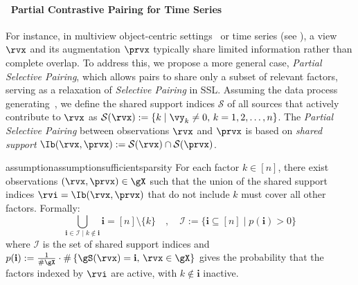 \documentclass{article} %
\theoremstyle{plain}
\theoremstyle{definition}
\newtheorem{assumption}[theorem]{Assumption}
\theoremstyle{remark}
\numberwithin{equation}{section}
\begin{document}
\vspace{-0.2cm}
\paragraph{\, Partial Contrastive Pairing for Time Series}
For instance, in multiview object-centric settings~\citep{Bengio2020A} or time series (see ), a view $\rvx$ and its augmentation $\prvx$ typically share limited information rather than complete overlap. To address this, we propose a more general case, \emph{Partial Selective Pairing}, which allows pairs to share only a subset of relevant factors, serving as a relaxation of \emph{Selective Pairing} in SSL. Assuming the data process generating~, we define the shared support indices $\mathcal{S} $ of all sources that actively contribute to $\rvx$ as $\mathcal{S}(\rvx) := \{ k \mid \vy_{k} \neq 0, \, k = 1, 2, \ldots, n \} $. The \emph{Partial Selective Pairing} between observations $\rvx $ and $\prvx $ is based on \emph{shared support}  $\Ib(\rvx, \prvx) :=\mathcal{S}(\rvx) \cap \mathcal{S}(\prvx)$.

\begin{restatable}{assumption}{assumptionsufficientsparsity}\label{assump:sufficient_partial_pairing}
For each factor $ k \in [n] $, there exist observations $(\rvx, \prvx) \in \gX$ such that the union of the shared support indices $\rvi = \Ib(\rvx, \prvx)$ that do not include $ k $ must cover all other factors. Formally:
\begin{equation}\label{eq-sufficient_partial_pairing}
\bigcup_{\mathbf{i} \in \mathcal{I} \mid k \notin \mathbf{i}} \mathbf{i} = [n] \setminus \{k\} \quad, \quad \mathcal{I} := \{ \mathbf{i} \subseteq [n] \mid p(\mathbf{i}) > 0 \}
\end{equation}
where \( \mathcal{I} \) is the set of shared support indices and \( p(\mathbf{i}) := \frac{1}{\# \gX} \cdot \# \left\{ \gS(\rvx) = \mathbf{i}, \, \rvx \in \gX \right\} \) gives the probability that the factors indexed by \( \rvi \) are active, with \( k \notin \mathbf{i} \) inactive.
\end{restatable}



\end{document}

